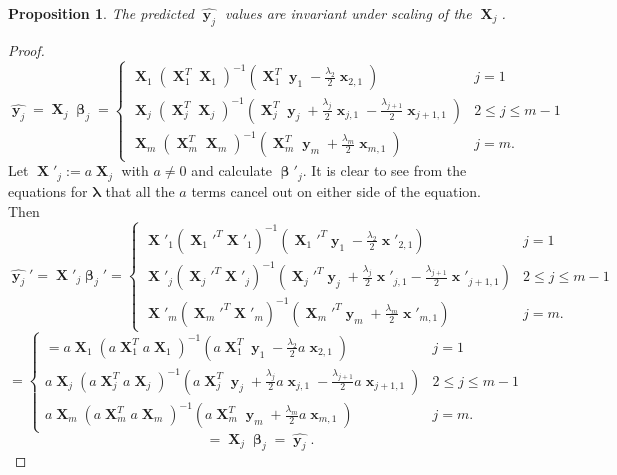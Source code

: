 \documentclass[12pt]{article}
\DeclareMathOperator{\bx}{\textbf{x}}
\DeclareMathOperator{\bX}{\textbf{X}}
\DeclareMathOperator{\by}{\textbf{y}}
\DeclareMathOperator{\bbeta}{\boldsymbol{\beta}}
\newtheorem{prop}{Proposition}
\begin{document}
\begin{prop}
The predicted $\widehat{\by_j}$ values are invariant under scaling of the $\bX_j$.
\end{prop}
\begin{proof}
$$\widehat{\by_j} = \bX_j \bbeta_j=\begin{cases}
\bX_1(\bX_1^T  \bX_1)^{-1}(\bX_1^T \by_1 -\frac{\lambda_{2}}{2}\bx_{2, 1}) & j=1 \\
\bX_j(\bX_j^T  \bX_j)^{-1}(\bX_j^T \by_j + \frac{\lambda_j}{2}\bx_{j, 1}-\frac{\lambda_{j+1}}{2}\bx_{j+1, 1}) & 2 \leq j \leq m-1 \\
\bX_m(\bX_m^T \bX_m)^{-1}(\bX_m^T \by_m + \frac{\lambda_m}{2}\bx_{m, 1}) & j=m.
\end{cases}$$
Let $\bX'_j := a\bX_j$ with $a \neq 0$ and calculate $\bbeta'_j$. It is clear to see from the equations for $\boldsymbol{\lambda}$ that all the $a$ terms cancel out on either side of the equation. Then 
$$\widehat{\by_j}' = \bX'_j \bbeta_j'=\begin{cases}
\bX'_1(\bX_1'^T  \bX'_1)^{-1}(\bX_1'^T \by_1 -\frac{\lambda_{2}}{2}\bx'_{2, 1}) & j=1 \\
\bX'_j(\bX_j'^T  \bX'_j)^{-1}(\bX_j'^T \by_j + \frac{\lambda_j}{2}\bx'_{j, 1}-\frac{\lambda_{j+1}}{2}\bx'_{j+1, 1}) & 2 \leq j \leq m-1 \\
\bX'_m(\bX_m'^T \bX'_m)^{-1}(\bX_m'^T \by_m + \frac{\lambda_m}{2}\bx'_{m, 1}) & j=m.
\end{cases}$$
$$=\begin{cases}
=a\bX_1(a\bX_1^T  a\bX_1)^{-1}(a\bX_1^T \by_1 -\frac{\lambda_{2}}{2}a\bx_{2, 1}) & j=1 \\
a\bX_j(a\bX_j^T  a\bX_j)^{-1}(a\bX_j^T \by_j + \frac{\lambda_j}{2}a\bx_{j, 1}-\frac{\lambda_{j+1}}{2}a\bx_{j+1, 1}) & 2 \leq j \leq m-1 \\
a\bX_m(a\bX_m^T a\bX_m)^{-1}(a\bX_m^T \by_m + \frac{\lambda_m}{2}a\bx_{m, 1}) & j=m.
\end{cases}$$
$$=\bX_j \bbeta_j = \widehat{\by_j}.$$
\end{proof}
\end{document}
